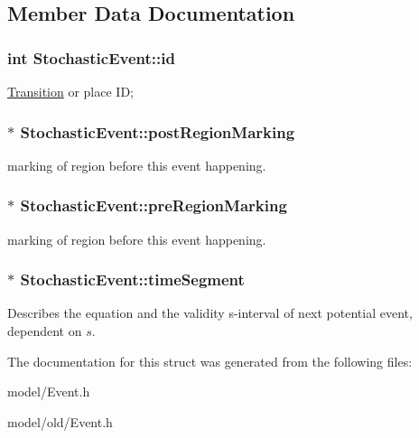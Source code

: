 \subsection{Member Data Documentation}
\hypertarget{structStochasticEvent_a359f6c7f5e9d624744e35fb187adcc73}{
\subsubsection[{id}]{\setlength{\rightskip}{0pt plus 5cm}int Stochastic\-Event\-::id}}\label{structStochasticEvent_a359f6c7f5e9d624744e35fb187adcc73}
\hyperlink{structTransition}{Transition} or place I\-D; \hypertarget{structStochasticEvent_a9c694991cdb06b9499b9c4295af4d98b}{
\subsubsection[{post\-Region\-Marking}]{ $\ast$ Stochastic\-Event\-::post\-Region\-Marking}}\label{structStochasticEvent_a9c694991cdb06b9499b9c4295af4d98b}
marking of region before this event happening. \hypertarget{structStochasticEvent_a3179b1980d441007158d7a9c77b8ca1d}{
\subsubsection[{pre\-Region\-Marking}]{ $\ast$ Stochastic\-Event\-::pre\-Region\-Marking}}\label{structStochasticEvent_a3179b1980d441007158d7a9c77b8ca1d}
marking of region before this event happening. \hypertarget{structStochasticEvent_a39fc3833721f4066c15044e6772a5435}{
\subsubsection[{time\-Segment}]{ $\ast$ Stochastic\-Event\-::time\-Segment}}\label{structStochasticEvent_a39fc3833721f4066c15044e6772a5435}
Describes the equation and the validity s-\/interval of next potential event, dependent on $ s $. 

The documentation for this struct was generated from the following files\-:\begin{DoxyCompactItemize}
\item 
model/Event.\-h\item 
model/old/Event.\-h\end{DoxyCompactItemize}
